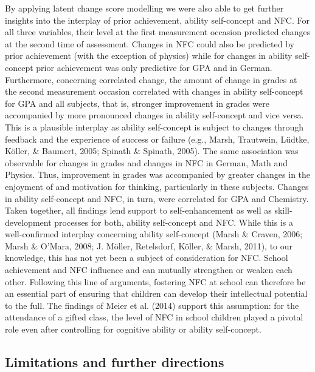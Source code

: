 \documentclass[
  man]{apa6}
\begin{document}
By applying latent change score modelling we were also able to get further insights into the interplay of prior achievement, ability self-concept and NFC. For all three variables, their level at the first measurement occasion predicted changes at the second time of assessment. Changes in NFC could also be predicted by prior achievement (with the exception of physics) while for changes in ability self-concept prior achievement was only predictive for GPA and in German. Furthermore, concerning correlated change, the amount of change in grades at the second measurement occasion correlated with changes in ability self-concept for GPA and all subjects, that is, stronger improvement in grades were accompanied by more pronounced changes in ability self-concept and vice versa. This is a plausible interplay as ability self-concept is subject to changes through feedback and the experience of success or failure (e.g., Marsh, Trautwein, Lüdtke, Köller, \& Baumert, 2005; Spinath \& Spinath, 2005). The same association was observable for changes in grades and changes in NFC in German, Math and Physics. Thus, improvement in grades was accompanied by greater changes in the enjoyment of and motivation for thinking, particularly in these subjects. Changes in ability self-concept and NFC, in turn, were correlated for GPA and Chemistry. Taken together, all findings lend support to self-enhancement as well as skill-development processes for both, ability self-concept and NFC. While this is a well-confirmed interplay concerning ability self-concept (Marsh \& Craven, 2006; Marsh \& O'Mara, 2008; J. Möller, Retelsdorf, Köller, \& Marsh, 2011), to our knowledge, this has not yet been a subject of consideration for NFC. School achievement and NFC influence and can mutually strengthen or weaken each other. Following this line of arguments, fostering NFC at school can therefore be an essential part of ensuring that children can develop their intellectual potential to the full. The findings of Meier et al. (2014) support this assumption: for the attendance of a gifted class, the level of NFC in school children played a pivotal role even after controlling for cognitive ability or ability self-concept.

\hypertarget{limitations-and-further-directions}{%
\subsection{Limitations and further directions}\label{limitations-and-further-directions}}
\end{document}
